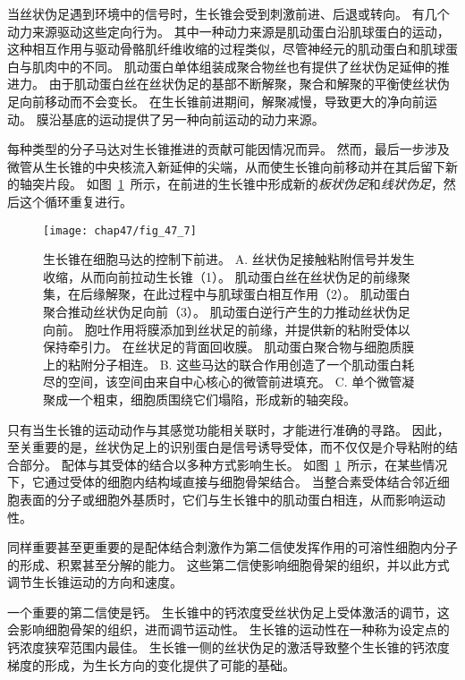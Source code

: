 当丝状伪足遇到环境中的信号时，生长锥会受到刺激前进、后退或转向。
有几个动力来源驱动这些定向行为。
其中一种动力来源是肌动蛋白沿肌球蛋白的运动，这种相互作用与驱动骨骼肌纤维收缩的过程类似，尽管神经元的肌动蛋白和肌球蛋白与肌肉中的不同。
肌动蛋白单体组装成聚合物丝也有提供了丝状伪足延伸的推进力。
由于肌动蛋白丝在丝状伪足的基部不断解聚，聚合和解聚的平衡使丝状伪足向前移动而不会变长。
在生长锥前进期间，解聚减慢，导致更大的净向前运动。
膜沿基底的运动提供了另一种向前运动的动力来源。


每种类型的分子马达对生长锥推进的贡献可能因情况而异。
然而，最后一步涉及微管从生长锥的中央核流入新延伸的尖端，从而使生长锥向前移动并在其后留下新的轴突片段。
如图~\ref{fig:47_7}~所示，在前进的生长锥中形成新的\textit{板状伪足}和\textit{线状伪足}，然后这个循环重复进行。


\begin{figure}[htbp]
	\centering
	\texttt{[image: chap47/fig\_47\_7]}
	\caption{生长锥在细胞马达的控制下前进\cite{heidemann1996cytoplasmic}。
		A. 丝状伪足接触粘附信号并发生收缩，从而向前拉动生长锥（1）。
		肌动蛋白丝在丝状伪足的前缘聚集，在后缘解聚，在此过程中与肌球蛋白相互作用（2）。
		肌动蛋白聚合推动丝状伪足向前（3）。
		肌动蛋白逆行产生的力推动丝状伪足向前。
		胞吐作用将膜添加到丝状足的前缘，并提供新的粘附受体以保持牵引力。
		在丝状足的背面回收膜。
		肌动蛋白聚合物与细胞质膜上的粘附分子相连。
		B. 这些马达的联合作用创造了一个肌动蛋白耗尽的空间，该空间由来自中心核心的微管前进填充。
		C. 单个微管凝聚成一个粗束，细胞质围绕它们塌陷，形成新的轴突段。}
	\label{fig:47_7}
\end{figure}


只有当生长锥的运动动作与其感觉功能相关联时，才能进行准确的寻路。
因此，至关重要的是，丝状伪足上的识别蛋白是信号诱导受体，而不仅仅是介导粘附的结合部分。
配体与其受体的结合以多种方式影响生长。
如图~\ref{fig:47_7}~所示，在某些情况下，它通过受体的细胞内结构域直接与细胞骨架结合。
当整合素受体结合邻近细胞表面的分子或细胞外基质时，它们与生长锥中的肌动蛋白相连，从而影响运动性。


同样重要甚至更重要的是配体结合刺激作为第二信使发挥作用的可溶性细胞内分子的形成、积累甚至分解的能力。
这些第二信使影响细胞骨架的组织，并以此方式调节生长锥运动的方向和速度。


一个重要的第二信使是钙。
生长锥中的钙浓度受丝状伪足上受体激活的调节，这会影响细胞骨架的组织，进而调节运动性。
生长锥的运动性在一种称为设定点的钙浓度狭窄范围内最佳。
生长锥一侧的丝状伪足的激活导致整个生长锥的钙浓度梯度的形成，为生长方向的变化提供了可能的基础。


